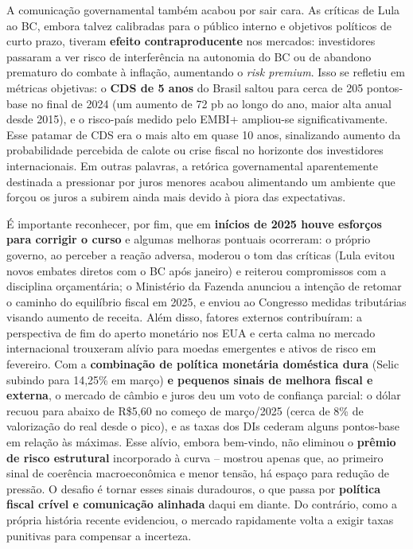 \documentclass[a4paper,12pt]{article}
\begin{document}
A comunicação governamental também acabou por sair cara. As críticas de Lula ao BC, embora talvez calibradas para o público interno e objetivos políticos de curto prazo, tiveram \textbf{efeito contraproducente} nos mercados: investidores passaram a ver risco de interferência na autonomia do BC ou de abandono prematuro do combate à inflação, aumentando o \textit{risk premium}. Isso se refletiu em métricas objetivas: o \textbf{CDS de 5 anos} do Brasil saltou para cerca de 205 pontos-base no final de 2024 (um aumento de 72 pb ao longo do ano, maior alta anual desde 2015), e o risco-país medido pelo EMBI+ ampliou-se significativamente. Esse patamar de CDS era o mais alto em quase 10 anos, sinalizando aumento da probabilidade percebida de calote ou crise fiscal no horizonte dos investidores internacionais. Em outras palavras, a retórica governamental aparentemente destinada a pressionar por juros menores acabou alimentando um ambiente que forçou os juros a subirem ainda mais devido à piora das expectativas.

É importante reconhecer, por fim, que em \textbf{inícios de 2025 houve esforços para corrigir o curso} e algumas melhoras pontuais ocorreram: o próprio governo, ao perceber a reação adversa, moderou o tom das críticas (Lula evitou novos embates diretos com o BC após janeiro) e reiterou compromissos com a disciplina orçamentária; o Ministério da Fazenda anunciou a intenção de retomar o caminho do equilíbrio fiscal em 2025, e enviou ao Congresso medidas tributárias visando aumento de receita. Além disso, fatores externos contribuíram: a perspectiva de fim do aperto monetário nos EUA e certa calma no mercado internacional trouxeram alívio para moedas emergentes e ativos de risco em fevereiro. Com a \textbf{combinação de política monetária doméstica dura} (Selic subindo para 14,25\% em março) \textbf{e pequenos sinais de melhora fiscal e externa}, o mercado de câmbio e juros deu um voto de confiança parcial: o dólar recuou para abaixo de R\$5,60 no começo de março/2025 (cerca de 8\% de valorização do real desde o pico), e as taxas dos DIs cederam alguns pontos-base em relação às máximas. Esse alívio, embora bem-vindo, não eliminou o \textbf{prêmio de risco estrutural} incorporado à curva -- mostrou apenas que, ao primeiro sinal de coerência macroeconômica e menor tensão, há espaço para redução de pressão. O desafio é tornar esses sinais duradouros, o que passa por \textbf{política fiscal crível e comunicação alinhada} daqui em diante. Do contrário, como a própria história recente evidenciou, o mercado rapidamente volta a exigir taxas punitivas para compensar a incerteza.
\end{document}

